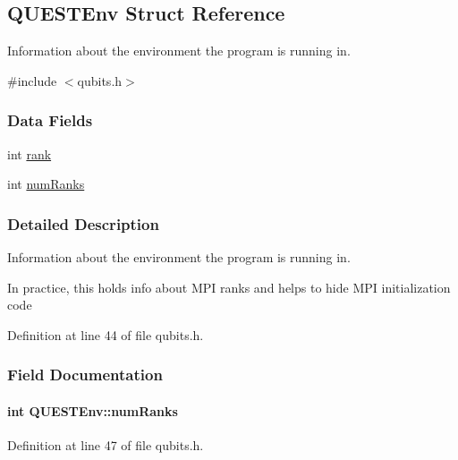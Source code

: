 \hypertarget{structQUESTEnv}{}\subsection{Q\+U\+E\+S\+T\+Env Struct Reference}
\label{structQUESTEnv}


Information about the environment the program is running in.  




{\ttfamily \#include $<$qubits.\+h$>$}

\subsubsection*{Data Fields}
\begin{DoxyCompactItemize}
\item 
int \hyperlink{structQUESTEnv_a1bdb6d425a2ce6a468f93929c0b26d73}{rank}
\item 
int \hyperlink{structQUESTEnv_ab9d9ce82e2d5f1b39aa9efc3accb3742}{num\+Ranks}
\end{DoxyCompactItemize}


\subsubsection{Detailed Description}
Information about the environment the program is running in. 

In practice, this holds info about M\+PI ranks and helps to hide M\+PI initialization code 

Definition at line 44 of file qubits.\+h.



\subsubsection{Field Documentation}
\paragraph[{\texorpdfstring{num\+Ranks}{numRanks}}]{\setlength{\rightskip}{0pt plus 5cm}int Q\+U\+E\+S\+T\+Env\+::num\+Ranks}\hypertarget{structQUESTEnv_ab9d9ce82e2d5f1b39aa9efc3accb3742}{}\label{structQUESTEnv_ab9d9ce82e2d5f1b39aa9efc3accb3742}


Definition at line 47 of file qubits.\+h.



